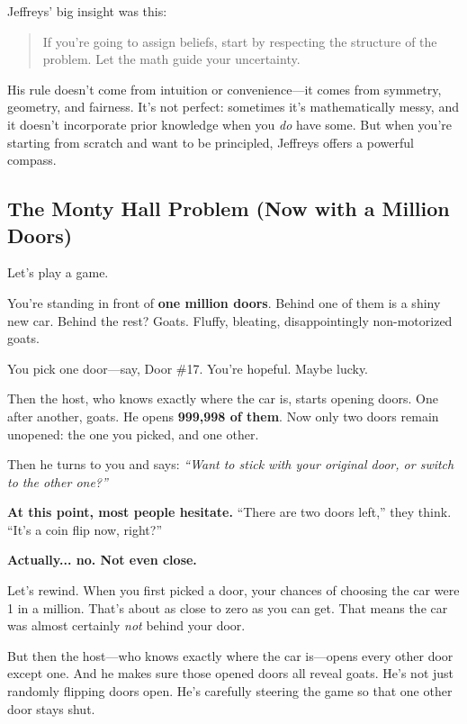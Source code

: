 Jeffreys’ big insight was this:

\begin{quote}
If you're going to assign beliefs, start by respecting the structure of the problem. Let the math guide your uncertainty.
\end{quote}

His rule doesn’t come from intuition or convenience—it comes from symmetry, geometry, and fairness. It’s not perfect: sometimes it’s mathematically messy, and it doesn’t incorporate prior knowledge when you \textit{do} have some. But when you're starting from scratch and want to be principled, Jeffreys offers a powerful compass.









\subsection{The Monty Hall Problem (Now with a Million Doors)}

Let’s play a game.

You’re standing in front of \textbf{one million doors}. Behind one of them is a shiny new car. Behind the rest? Goats. Fluffy, bleating, disappointingly non-motorized goats.

You pick one door—say, Door \#17. You’re hopeful. Maybe lucky.

Then the host, who knows exactly where the car is, starts opening doors. One after another, goats. He opens \textbf{999,998 of them}. Now only two doors remain unopened: the one you picked, and one other.

Then he turns to you and says:  
\textit{“Want to stick with your original door, or switch to the other one?”}

\vspace{0.5em}
\noindent
\textbf{At this point, most people hesitate.}  
“There are two doors left,” they think. “It’s a coin flip now, right?”

\textbf{Actually... no. Not even close.}

\vspace{0.5em}
\noindent
Let’s rewind. When you first picked a door, your chances of choosing the car were 1 in a million. That’s about as close to zero as you can get. That means the car was almost certainly \textit{not} behind your door.

But then the host—who knows exactly where the car is—opens every other door except one. And he makes sure those opened doors all reveal goats. He’s not just randomly flipping doors open. He’s carefully steering the game so that one other door stays shut.

